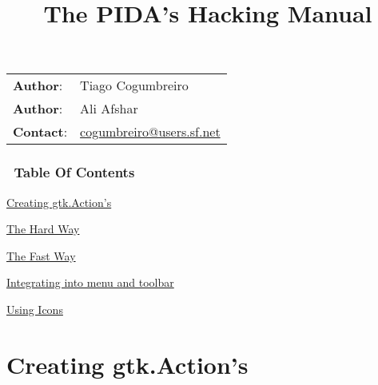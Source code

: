 \documentclass[10pt,a4paper,english]{article}
\title{The PIDA's Hacking Manual}
\author{}
\date{}
\newlength{\docinfowidth}
\newlength{\locallinewidth}
\begin{document}
\maketitle

\begin{center}
\begin{tabularx}{\docinfowidth}{lX}
\textbf{Author}: &
	Tiago Cogumbreiro \\
\textbf{Author}: &
	Ali Afshar \\
\textbf{Contact}: &
	\href{mailto:cogumbreiro@users.sf.net}{cogumbreiro@users.sf.net} \\
\end{tabularx}
\end{center}

\setlength{\locallinewidth}{\linewidth}
\hypertarget{table-of-contents}{}
\subsubsection*{~\hfill Table Of Contents\hfill ~}
\begin{list}{}{}
\item {} \href{\#creating-gtk-action-s}{Creating gtk.Action's}
\begin{list}{}{}
\item {} \href{\#the-hard-way}{The Hard Way}

\item {} \href{\#the-fast-way}{The Fast Way}

\end{list}

\item {} \href{\#integrating-into-menu-and-toolbar}{Integrating into menu and toolbar}

\item {} \href{\#using-icons}{Using Icons}

\end{list}




\hypertarget{creating-gtk-action-s}{}
\section*{Creating gtk.Action's}
\end{document}
